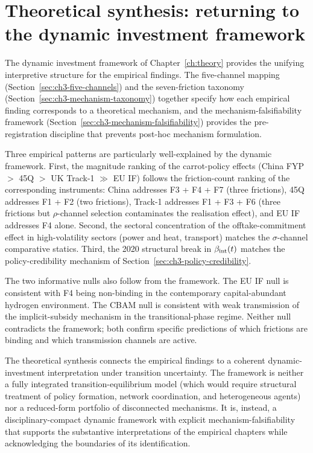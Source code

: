 \section{Theoretical synthesis: returning to the dynamic investment framework}
\label{sec:ch10-theoretical-synthesis}

The dynamic investment framework of Chapter~\ref{ch:theory} provides the unifying interpretive structure for the empirical findings. The five-channel mapping (Section~\ref{sec:ch3-five-channels}) and the seven-friction taxonomy (Section~\ref{sec:ch3-mechanism-taxonomy}) together specify how each empirical finding corresponds to a theoretical mechanism, and the mechanism-falsifiability framework (Section~\ref{sec:ch3-mechanism-falsifiability}) provides the pre-registration discipline that prevents post-hoc mechanism formulation.

Three empirical patterns are particularly well-explained by the dynamic framework. First, the magnitude ranking of the carrot-policy effects (China FYP $>$ 45Q $>$ UK Track-1 $\gg$ EU IF) follows the friction-count ranking of the corresponding instruments: China addresses F3 + F4 + F7 (three frictions), 45Q addresses F1 + F2 (two frictions), Track-1 addresses F1 + F3 + F6 (three frictions but $\rho$-channel selection contaminates the realisation effect), and EU IF addresses F4 alone. Second, the sectoral concentration of the offtake-commitment effect in high-volatility sectors (power and heat, transport) matches the $\sigma$-channel comparative statics. Third, the 2020 structural break in $\beta_{\mathrm{int}}(t)$ matches the policy-credibility mechanism of Section~\ref{sec:ch3-policy-credibility}.

The two informative nulls also follow from the framework. The EU IF null is consistent with F4 being non-binding in the contemporary capital-abundant hydrogen environment. The CBAM null is consistent with weak transmission of the implicit-subsidy mechanism in the transitional-phase regime. Neither null contradicts the framework; both confirm specific predictions of which frictions are binding and which transmission channels are active.

The theoretical synthesis connects the empirical findings to a coherent dynamic-investment interpretation under transition uncertainty. The framework is neither a fully integrated transition-equilibrium model (which would require structural treatment of policy formation, network coordination, and heterogeneous agents) nor a reduced-form portfolio of disconnected mechanisms. It is, instead, a disciplinary-compact dynamic framework with explicit mechanism-falsifiability that supports the substantive interpretations of the empirical chapters while acknowledging the boundaries of its identification.


